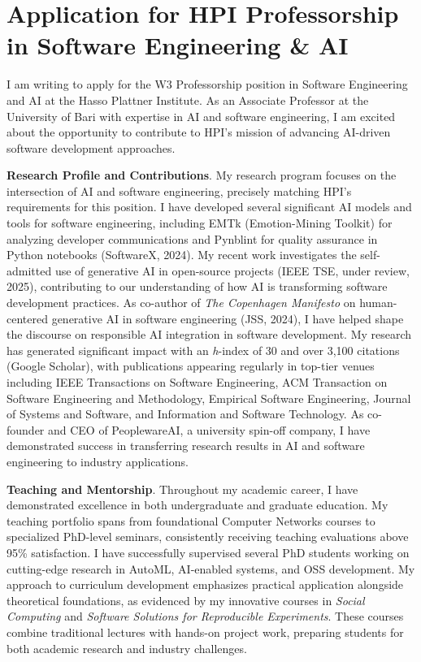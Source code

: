 \section{Application for HPI Professorship in Software Engineering \& AI}

I am writing to apply for the W3 Professorship position in Software Engineering and AI at the Hasso Plattner Institute.
As an Associate Professor at the University of Bari with expertise in AI and software engineering, I am excited about the opportunity to contribute to HPI's mission of advancing AI-driven software development approaches.

\textbf{Research Profile and Contributions}.
My research program focuses on the intersection of AI and software engineering, precisely matching HPI's requirements for this position. 
I have developed several significant AI models and tools for software engineering, including EMTk (Emotion-Mining Toolkit) for analyzing developer communications and Pynblint for quality assurance in Python notebooks (SoftwareX, 2024).
My recent work investigates the self-admitted use of generative AI in open-source projects (IEEE TSE, under review, 2025), contributing to our understanding of how AI is transforming software development practices. 
As co-author of \textit{The Copenhagen Manifesto} on human-centered generative AI in software engineering (JSS, 2024), I have helped shape the discourse on responsible AI integration in software development. 
My research has generated significant impact with an \textit{h}-index of 30 and over 3,100 citations (Google Scholar), with publications appearing regularly in top-tier venues including IEEE Transactions on Software Engineering, ACM Transaction on Software Engineering and Methodology, Empirical Software Engineering, Journal of Systems and Software, and Information and Software Technology.
As co-founder and CEO of PeoplewareAI, a university spin-off company, I have demonstrated success in transferring research results in AI and software engineering to industry applications. 

\textbf{Teaching and Mentorship}.
Throughout my academic career, I have demonstrated excellence in both undergraduate and graduate education. 
My teaching portfolio spans from foundational Computer Networks courses to specialized PhD-level seminars, consistently receiving teaching evaluations above 95\% satisfaction. 
I have successfully supervised several PhD students working on cutting-edge research in AutoML, AI-enabled systems, and OSS development. 
My approach to curriculum development emphasizes practical application alongside theoretical foundations, as evidenced by my innovative courses in \textit{Social Computing} and \textit{Software Solutions for Reproducible Experiments}.
These courses combine traditional lectures with hands-on project work, preparing students for both academic research and industry challenges.

